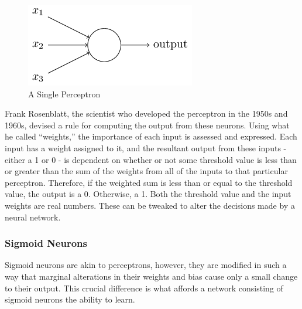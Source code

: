 \documentclass[12pt,a4paper]{article}
\begin{document}
\begin{figure}[h]
	\centering
	\includegraphics{Perceptron.png}
	\caption{A Single Perceptron}
\end{figure}

Frank Rosenblatt, the scientist who developed the perceptron in the 1950s and 1960s, devised a rule for computing the output from these neurons. Using what he called \enquote{weights,} the importance of each input is assessed and expressed. Each input has a weight assigned to it, and the resultant output from these inputs - either a 1 or 0 - is dependent on whether or not some threshold value is less than or greater than the sum of the weights from all of the inputs to that particular perceptron. Therefore, if the weighted sum is less than or equal to the threshold value, the output is a 0. Otherwise, a 1\citep{NeuralNetworksAndDeepLearning}. Both the threshold value and the input weights are real numbers. These can be tweaked to alter the decisions made by a neural network. 

\subsubsection{Sigmoid Neurons}

Sigmoid neurons are akin to perceptrons, however, they are modified in such a way that marginal alterations in their weights and bias cause only a small change to their output\citep{NeuralNetworksAndDeepLearning}. This crucial difference is what affords a network consisting of sigmoid neurons the ability to learn.
\end{document}

